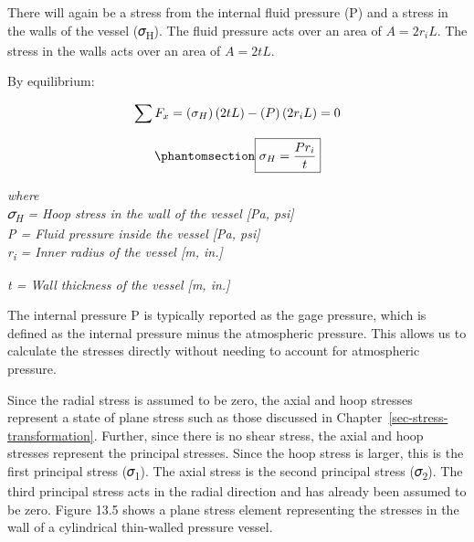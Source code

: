 \documentclass[
  letterpaper,
  DIV=11,
  numbers=noendperiod]{scrreprt}
\theoremstyle{definition}
\theoremstyle{remark}
\begin{document}
There will again be a stress from the internal fluid pressure (P) and a
stress in the walls of the vessel (𝜎\textsubscript{H}). The fluid
pressure acts over an area of \(A=2 r_i L\). The stress in the walls
acts over an area of \(A=2 t L\).

By equilibrium:

\[
\sum F_x=\left(\sigma_H\right)(2 t L)-(P)\left(2 r_i L\right)=0 \\
\]

\begin{equation}\phantomsection\label{eq-13.2}{
\boxed{\sigma_H=\frac{P r_i}{t}}
}\end{equation}

\emph{where}\\
\emph{𝜎\textsubscript{H} = Hoop stress in the wall of the vessel {[}Pa,
psi{]}}\\
\emph{P = Fluid pressure inside the vessel {[}Pa, psi{]}}\\
\emph{r\textsubscript{i} = Inner radius of the vessel {[}m, in.{]}}

\emph{t = Wall thickness of the vessel {[}m, in.{]}}

The internal pressure P is typically reported as the gage pressure,
which is defined as the internal pressure minus the atmospheric
pressure. This allows us to calculate the stresses directly without
needing to account for atmospheric pressure.

Since the radial stress is assumed to be zero, the axial and hoop
stresses represent a state of plane stress such as those discussed in
Chapter~\ref{sec-stress-transformation}. Further, since there is no
shear stress, the axial and hoop stresses represent the principal
stresses. Since the hoop stress is larger, this is the first principal
stress (𝜎\textsubscript{1}). The axial stress is the second principal
stress (𝜎\textsubscript{2}). The third principal stress acts in the
radial direction and has already been assumed to be zero. Figure 13.5
shows a plane stress element representing the stresses in the wall of a
cylindrical thin-walled pressure vessel.
\end{document}
